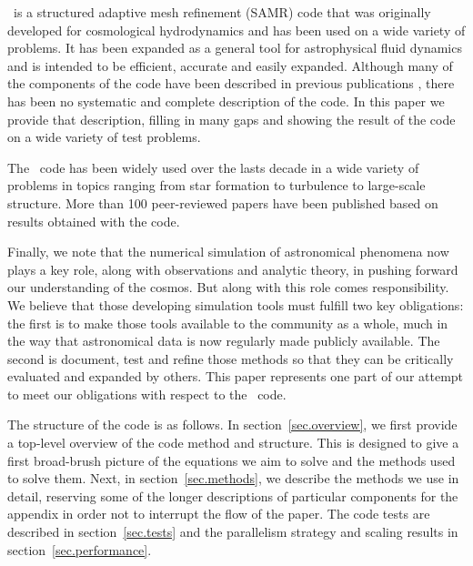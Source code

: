 \enzo\ is a structured adaptive mesh refinement (SAMR) code that was originally developed for cosmological hydrodynamics and has been used on a wide variety of problems.  It has been expanded as a general tool for astrophysical fluid dynamics and is intended to be efficient, accurate and easily expanded.  Although many of the components of the code have been described in previous publications \citep{1995CoPhC..89..149B, BryanThesis96, Bryan97a, Bryan97b, Norman99, BryanCompSci99, Bryan01, Oshea04}, there has been no systematic and complete description of the code.  In this paper we provide that description, filling in many gaps and showing the result of the code on a wide variety of test problems.

The \enzo\ code has been widely used over the lasts decade in a wide variety of problems in topics ranging from star formation to turbulence to large-scale structure.  More than 100 peer-reviewed papers have been published based on results obtained with the code.

Finally, we note that the numerical simulation of astronomical phenomena now plays a key role, along with observations and analytic theory, in pushing forward our understanding of the cosmos.
But along with this role comes responsibility.  We believe that those developing simulation tools must fulfill two key obligations: the first is to make those tools available to the community as a whole, much in the way that astronomical data is now regularly made publicly available.  The second is document, test and refine those methods so that they can be critically evaluated and expanded by others.  This paper represents one part of our attempt to meet our obligations with respect to the \enzo\ code.

The structure of the code is as follows.  In section~\ref{sec.overview}, we first provide a top-level overview of the code method and structure.  This is designed to give a first broad-brush picture of the equations we aim to solve and the methods used to solve them.  Next, in section~\ref{sec.methods}, we describe the methods we use in detail, reserving some of the longer descriptions of particular components for the appendix in order not to interrupt the flow of the paper.  The code tests are described in section~\ref{sec.tests} and the parallelism strategy and scaling results in section~\ref{sec.performance}.

